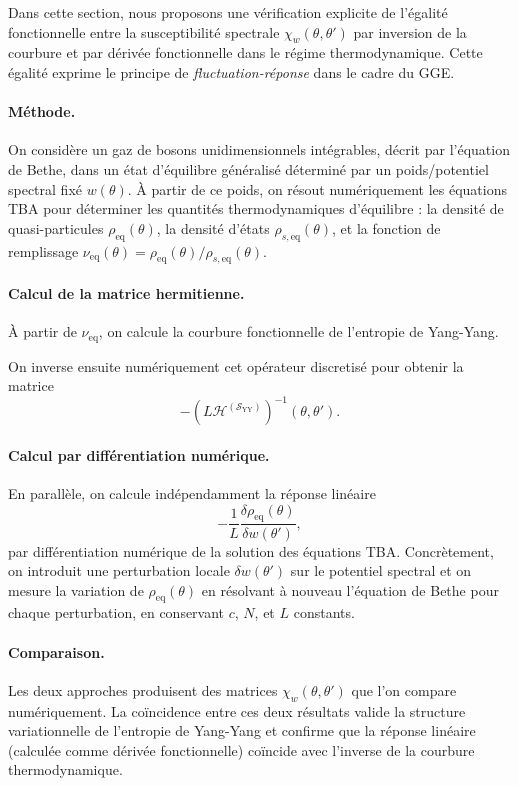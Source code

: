 Dans cette section, nous proposons une vérification explicite de l'égalité fonctionnelle entre la susceptibilité spectrale \( \chi_w(\theta, \theta') \) par inversion de la courbure et par dérivée fonctionnelle dans le régime thermodynamique. Cette égalité exprime le principe de \emph{fluctuation-réponse} dans le cadre du GGE.

\paragraph{Méthode.} On considère un gaz de bosons unidimensionnels intégrables, décrit par l’équation de Bethe, dans un état d’équilibre généralisé déterminé par un poids/potentiel spectral fixé \( w(\theta) \). À partir de ce poids, on résout numériquement les équations TBA pour déterminer les quantités thermodynamiques d'équilibre : la densité de quasi-particules \( \rho_{\mathrm{eq}}(\theta) \), la densité d'états \( \rho_{s,\mathrm{eq}}(\theta) \), et la fonction de remplissage \( \nu_{\! \mathrm{eq}}(\theta) = \rho_{\! \mathrm{eq}}(\theta) / \rho_{\! s,\mathrm{eq}}(\theta) \).

\paragraph{Calcul de la matrice hermitienne.}
À partir de \( \nu_{\mathrm{eq}} \), on calcule la courbure fonctionnelle de l'entropie de Yang-Yang.

On inverse ensuite numériquement cet opérateur discretisé pour obtenir la matrice
\[
 - \left( L \mathcal{H}^{(\mathcal{S}_{\mathrm{YY}})} \right)^{-1} (\theta, \theta').
\]

\paragraph{Calcul par différentiation numérique.}
En parallèle, on calcule indépendamment la réponse linéaire
\[
 - \frac{1}{L} \frac{\delta \rho_{\mathrm{eq}}(\theta)}{\delta w(\theta')},
\]
par différentiation numérique de la solution des équations TBA. Concrètement, on introduit une perturbation locale \( \delta w(\theta') \) sur le potentiel spectral et on mesure la variation de \( \rho_{\mathrm{eq}}(\theta) \) en résolvant à nouveau l’équation de Bethe pour chaque perturbation, en conservant \( c \), \( N \), et \( L \) constants.

\paragraph{Comparaison.}
Les deux approches produisent des matrices \(\chi_w(\theta, \theta')\) que l’on compare numériquement. La coïncidence entre ces deux résultats valide la structure variationnelle de l'entropie de Yang-Yang et confirme que la réponse linéaire (calculée comme dérivée fonctionnelle) coïncide avec l’inverse de la courbure thermodynamique.

